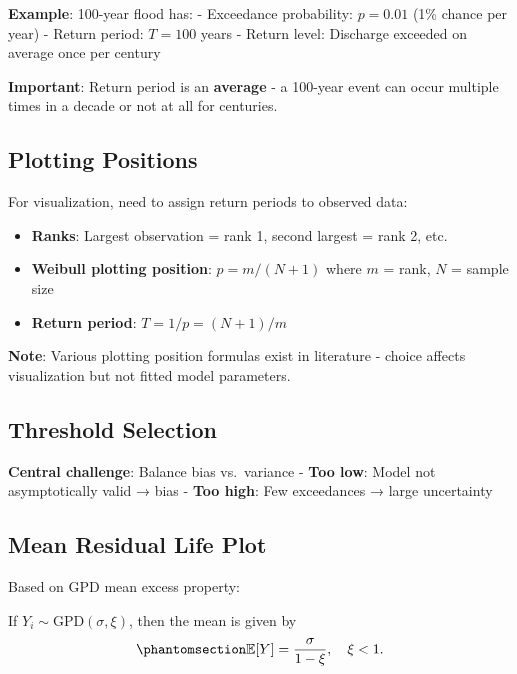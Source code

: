 \documentclass[
  letterpaper,
  DIV=11,
  numbers=noendperiod]{scrreprt}
\providecommand{\tightlist}{%
  \setlength{\itemsep}{0pt}\setlength{\parskip}{0pt}}
\begin{document}
\textbf{Example}: 100-year flood has: - Exceedance probability:
\(p = 0.01\) (1\% chance per year) - Return period: \(T = 100\) years -
Return level: Discharge exceeded on average once per century

\textbf{Important}: Return period is an \textbf{average} - a 100-year
event can occur multiple times in a decade or not at all for centuries.

\subsection{Plotting Positions}\label{plotting-positions}

For visualization, need to assign return periods to observed data:

\begin{itemize}
\tightlist
\item
  \textbf{Ranks}: Largest observation = rank 1, second largest = rank 2,
  etc.
\item
  \textbf{Weibull plotting position}: \(p = m/(N+1)\) where \(m\) =
  rank, \(N\) = sample size
\item
  \textbf{Return period}: \(T = 1/p = (N+1)/m\)
\end{itemize}

\textbf{Note}: Various plotting position formulas exist in literature -
choice affects visualization but not fitted model parameters.

\subsection{Threshold Selection}\label{threshold-selection}

\textbf{Central challenge}: Balance bias vs.~variance - \textbf{Too
low}: Model not asymptotically valid → bias - \textbf{Too high}: Few
exceedances → large uncertainty

\subsection{Mean Residual Life Plot}\label{mean-residual-life-plot}

Based on GPD mean excess property:

If \(Y_i \sim \text{GPD}(\sigma, \xi)\), then the mean is given by
\begin{equation}\phantomsection\label{eq-gpd-mean}{
\mathbb{E}[Y] = \frac{\sigma}{1 - \xi}, \quad \xi < 1.
}\end{equation}
\end{document}
